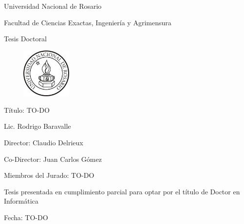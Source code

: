 
\begin{titlepage}
\begin{center}

Universidad Nacional de Rosario

Facultad de Ciencias Exactas, Ingeniería y Agrimensura

Tesis Doctoral

\begin{figure}[h!]
\centering
\includegraphics[width=2.5cm]{figures/logounr}
\end{figure}

\vspace{2cm}


{\huge Título: TO-DO}
\vspace{2cm}

{\large Lic. Rodrigo Baravalle}
\vspace{2cm}

{\large Director: Claudio Delrieux}

{\large Co-Director: Juan Carlos Gómez}

\vspace{2cm}
{\large Miembros del Jurado: TO-DO}

\vspace{2cm}
{\large Tesis presentada en cumplimiento parcial para optar por el título de Doctor en Informática}

\vspace{1cm}
Fecha: TO-DO
\end{center}
\end{titlepage}

